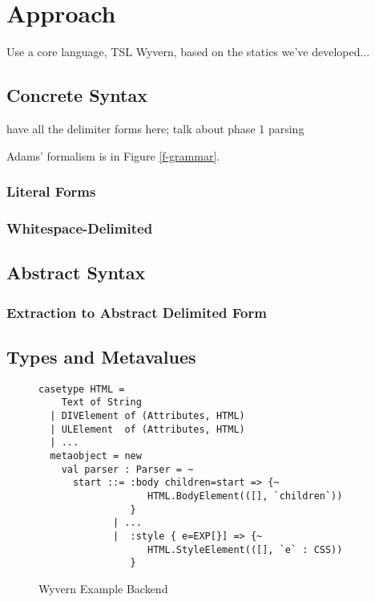 \section{Approach}
\label{s:approach}
Use a core language, TSL Wyvern, based on the statics we've developed...


\subsection{Concrete Syntax}
have all the delimiter forms here; talk about phase 1 parsing

Adams' formalism is in Figure \ref{f-grammar}.


\subsubsection{Literal Forms}
\subsubsection{Whitespace-Delimited}

\subsection{Abstract Syntax}
\subsubsection{Extraction to Abstract Delimited Form}

\subsection{Types and Metavalues}


\begin{figure}
\begin{lstlisting}
casetype HTML = 
    Text of String 
  | DIVElement of (Attributes, HTML)
  | ULElement  of (Attributes, HTML)
  | ...
  metaobject = new
    val parser : Parser = ~
      start ::= :body children=start => {~ 
                   HTML.BodyElement(([], `children`))
                } 
             | ...
             |  :style { e=EXP[}] => {~
                   HTML.StyleElement(([], `e` : CSS))
                }
\end{lstlisting}
\caption{Wyvern Example Backend}
\label{}
\end{figure}


